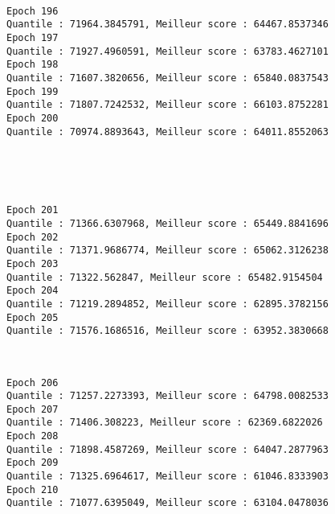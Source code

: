 \documentclass[11pt]{article}
\begin{document}
    \begin{center}
    \end{center}
    { \hspace*{\fill} \\}
    
    \begin{Verbatim}[commandchars=\\\{\}]
Epoch 196
Quantile : 71964.3845791, Meilleur score : 64467.8537346
Epoch 197
Quantile : 71927.4960591, Meilleur score : 63783.4627101
Epoch 198
Quantile : 71607.3820656, Meilleur score : 65840.0837543
Epoch 199
Quantile : 71807.7242532, Meilleur score : 66103.8752281
Epoch 200
Quantile : 70974.8893643, Meilleur score : 64011.8552063

    \end{Verbatim}

    \begin{center}
    \end{center}
    { \hspace*{\fill} \\}
    
    \begin{center}
    \end{center}
    { \hspace*{\fill} \\}
    
    \begin{Verbatim}[commandchars=\\\{\}]
Epoch 201
Quantile : 71366.6307968, Meilleur score : 65449.8841696
Epoch 202
Quantile : 71371.9686774, Meilleur score : 65062.3126238
Epoch 203
Quantile : 71322.562847, Meilleur score : 65482.9154504
Epoch 204
Quantile : 71219.2894852, Meilleur score : 62895.3782156
Epoch 205
Quantile : 71576.1686516, Meilleur score : 63952.3830668

    \end{Verbatim}

    \begin{center}
    \end{center}
    { \hspace*{\fill} \\}
    
    \begin{Verbatim}[commandchars=\\\{\}]
Epoch 206
Quantile : 71257.2273393, Meilleur score : 64798.0082533
Epoch 207
Quantile : 71406.308223, Meilleur score : 62369.6822026
Epoch 208
Quantile : 71898.4587269, Meilleur score : 64047.2877963
Epoch 209
Quantile : 71325.6964617, Meilleur score : 61046.8333903
Epoch 210
Quantile : 71077.6395049, Meilleur score : 63104.0478036

    \end{Verbatim}
\end{document}
